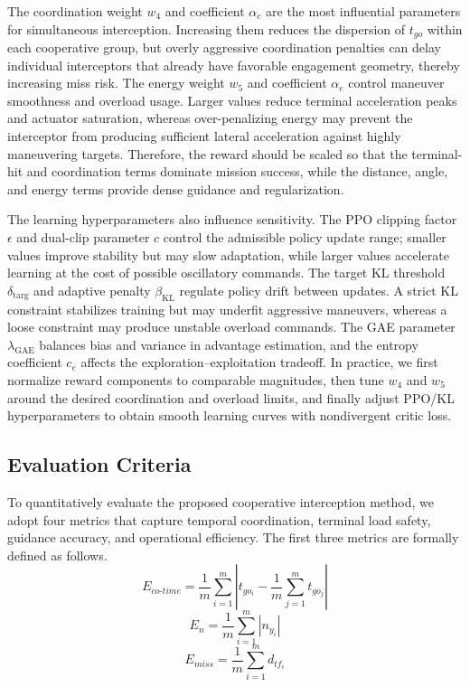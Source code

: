 \documentclass[lettersize,journal]{IEEEtran}
\begin{document}
The coordination weight $w_4$ and coefficient $\alpha_c$ are the most influential parameters
for simultaneous interception. Increasing them reduces the dispersion of $t_{go}$ within each
cooperative group, but overly aggressive coordination penalties can delay individual
interceptors that already have favorable engagement geometry, thereby increasing miss risk.
The energy weight $w_5$ and coefficient $\alpha_e$ control maneuver smoothness and overload
usage. Larger values reduce terminal acceleration peaks and actuator saturation, whereas
over-penalizing energy may prevent the interceptor from producing sufficient lateral
acceleration against highly maneuvering targets. Therefore, the reward should be scaled so
that the terminal-hit and coordination terms dominate mission success, while the distance,
angle, and energy terms provide dense guidance and regularization.

The learning hyperparameters also influence sensitivity. The PPO clipping factor $\epsilon$
and dual-clip parameter $c$ control the admissible policy update range; smaller values improve
stability but may slow adaptation, while larger values accelerate learning at the cost of
possible oscillatory commands. The target KL threshold $\delta_{\text{targ}}$ and adaptive
penalty $\beta_{\mathrm{KL}}$ regulate policy drift between updates. A strict KL constraint
stabilizes training but may underfit aggressive maneuvers, whereas a loose constraint may
produce unstable overload commands. The GAE parameter $\lambda_{\mathrm{GAE}}$ balances bias
and variance in advantage estimation, and the entropy coefficient $c_e$ affects the
exploration--exploitation tradeoff. In practice, we first normalize reward components to
comparable magnitudes, then tune $w_4$ and $w_5$ around the desired coordination and overload
limits, and finally adjust PPO/KL hyperparameters to obtain smooth learning curves with
nondivergent critic loss.

\subsection{Evaluation Criteria}
\label{subsec:eval}

To quantitatively evaluate the proposed cooperative interception method, we adopt four metrics that capture temporal coordination, terminal load safety, guidance accuracy, and operational efficiency. The first three metrics are formally defined as follows.
\begin{equation}
\label{E1}
E_{co\text{-}time} = \frac{1}{m}\sum_{i=1}^{m} \left| t_{go_i} - \frac{1}{m}\sum_{j=1}^{m} t_{go_j} \right|
\end{equation}
\begin{equation}
\label{E2}
E_{n} = \frac{1}{m}\sum_{i=1}^{m} |n_{y_i}|
\end{equation}
\begin{equation}
\label{E3}
E_{miss} = \frac{1}{m}\sum_{i=1}^{m} d_{tf_i}
\end{equation}
\end{document}
